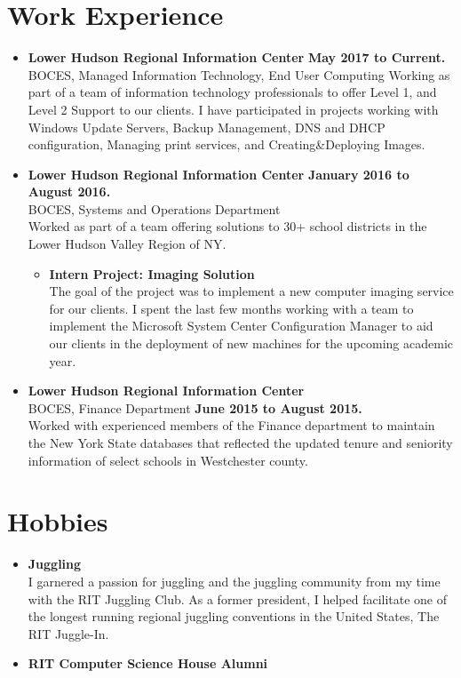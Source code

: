 \documentclass[10pt]{Article}
\begin{document}
\section*{Work Experience}
\begin{itemize}[topsep=1ex, itemsep=.5ex, parsep=0ex, partopsep=.75ex]
	\item[] {{\bf Lower Hudson Regional Information Center} \hfill {\bf May 2017 to Current.}}\\
	BOCES, Managed Information Technology, End User Computing
	Working as part of a team of information technology professionals to offer Level 1, and Level 2 Support to our clients.
	I have participated in projects working with Windows Update Servers, Backup Management, DNS and DHCP configuration, Managing print services, and Creating\&Deploying Images.
	\item[] {{\bf Lower Hudson Regional Information Center} \hfill {\bf January 2016 to August 2016.}}\\
	BOCES, Systems and Operations Department\\
	Worked as part of a team offering solutions to 30+ school districts in the Lower Hudson Valley Region of NY.
	\begin{itemize}[topsep=1ex, itemsep=.5ex, parsep=0ex, partopsep=.75ex]
		\item[] {\bf Intern Project: Imaging Solution}\\
		The goal of the project was to implement a new computer imaging service for our clients. I spent the last few months working with a team to implement the Microsoft System Center Configuration Manager to aid our clients in the deployment of new machines for the upcoming academic year.
	\end{itemize}
	\item[]{{\bf Lower Hudson Regional Information Center}\\
	BOCES, Finance Department \hfill {\bf June 2015 to August 2015.}}\\
	Worked with experienced members of the Finance department to maintain the New York
	State databases that reflected the updated tenure and seniority information of select schools in Westchester county.
\end{itemize}

\section*{Hobbies}
\begin{itemize}[topsep=1ex, itemsep=.5ex, parsep=0ex, partopsep=.75ex]
	\item[] {\bf Juggling}\\
	I garnered a passion for juggling and the juggling community from my time with the RIT Juggling Club. As a former president, I helped facilitate one of the longest running regional juggling conventions in the United States, The RIT Juggle-In.
	\item[] {\bf RIT Computer Science House Alumni}\\
\end{itemize}
\end{document}
